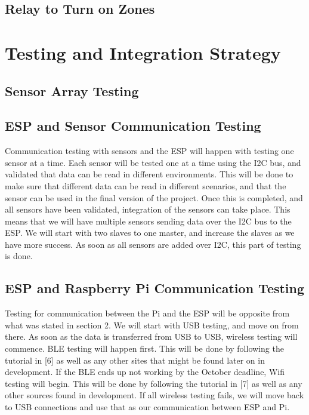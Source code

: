 \documentclass[letterpaper, 10 pt, conference]{ieeeconf}  %
\begin{document}
\subsection{Relay to Turn on Zones}

\section{Testing and Integration Strategy}

\subsection{Sensor Array Testing}

\subsection{ESP and Sensor Communication Testing}
Communication testing with sensors and the ESP will happen with testing one sensor at a time. Each sensor will be tested one at a time using the I2C bus, and validated that data can be read in different environments. This will be done to make sure that different data can be read in different scenarios, and that the sensor can be used in the final version of the project. Once this is completed, and all sensors have been validated, integration of the sensors can take place. This means that we will have multiple sensors sending data over the I2C bus to the ESP. We will start with two slaves to one master, and increase the slaves as we have more success. As soon as all sensors are added over I2C, this part of testing is done. 
\subsection{ESP and Raspberry Pi Communication Testing}

Testing for communication between the Pi and the ESP will be opposite from what was stated in section 2. We will start with USB testing, and move on from there. As soon as the data is transferred from USB to USB, wireless testing will commence. BLE testing will happen first. This will be done by following the tutorial in [6] as well as any other sites that might be found later on in development. If the BLE ends up not working by the October deadline, Wifi testing will begin. This will be done by following the tutorial in [7] as well as any other sources found in development. If all wireless testing fails, we will move back to USB connections and use that as our communication between ESP and Pi. 
\end{document}
